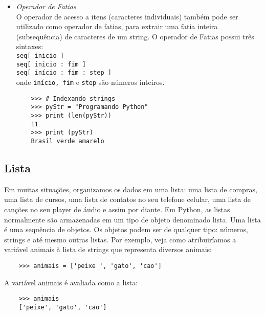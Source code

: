 \begin{itemize}
      \item \textit{Operador de Fatias}\\
      O operador de acesso a itens (caracteres individuais) tamb\'{e}m pode ser utilizado como operador de fatias, para extrair uma fatia inteira (subsequ\^{e}ncia) de caracteres de um string. O operador de Fatias possui tr\^{e}s sintaxes:\\
      \texttt{seq[ inicio ]}\\
      \texttt{seq[ inicio : fim ]} \\
      \texttt{seq[ in\'{\i}cio : fim : step ]}\\
      onde \texttt{in\'{\i}cio, fim} e \texttt{step} s\~{a}o n\'{u}meros inteiros.
     \begin{lstlisting}
    >>> # Indexando strings
    >>> pyStr = "Programando Python"
    >>> print (len(pyStr))
    11
    >>> print (pyStr)
    Brasil verde amarelo
        \end{lstlisting}

    \end{itemize}

			\subsection{Lista}
			Em muitas situações, organizamos os dados em uma lista: uma lista de compras, uma lista de
			cursos, uma lista de contatos no seu telefone celular, uma lista de canções no seu player de áudio
			e assim por diante. Em Python, as listas normalmente são armazenadas em um tipo de objeto
			denominado lista. Uma lista é uma sequência de objetos. Os objetos podem ser de qualquer tipo:
			números, strings e até mesmo outras listas. Por exemplo, veja como atribuiríamos a
			variável animais à lista de strings que representa diversos animais:
			
			\begin{lstlisting}
	>>> animais = ['peixe ', 'gato', 'cao']
			\end{lstlisting}
		
			A variável animais é avaliada como a lista:
			
			\begin{lstlisting}
	>>> animais
	['peixe', 'gato', 'cao']
			\end{lstlisting}
			
